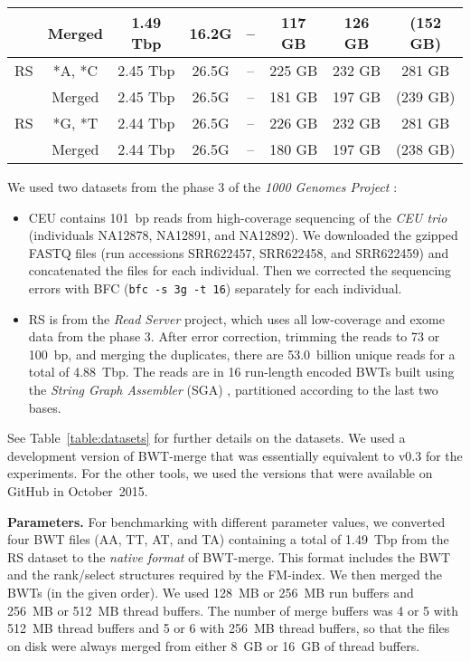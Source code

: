 \documentclass[smallabstract,smallcaptions]{dccpaper}
\newcommand{\BWT}{\textsf{BWT}}
\newcommand{\rank}{\textsf{rank}}
\newcommand{\select}{\textsf{select}}
\newcommand{\BWTmerge}{\textsf{BWT\nobreakdash-merge}}
\newcommand{\CEU}{\textsf{CEU}}
\newcommand{\RS}{\textsf{RS}}
\begin{document}
\begin{table}[t!]
\begin{center}
{\begin{tabular}{cc|cc|cc|cc}
     & Merged  & 1.49 Tbp & 16.2G &      -- &  117 GB &  126 GB & (152 GB) \\
\hline
\RS  & *A, *C  & 2.45 Tbp & 26.5G &      -- &  225 GB &  232 GB &   281 GB \\
     & Merged  & 2.45 Tbp & 26.5G &      -- &  181 GB &  197 GB & (239 GB) \\
\hline
\RS  & *G, *T  & 2.44 Tbp & 26.5G &      -- &  226 GB &  232 GB &   281 GB \\
     & Merged  & 2.44 Tbp & 26.5G &      -- &  180 GB &  197 GB & (238 GB) \\
\hline
\end{tabular}}
\end{center}
\end{table}

We used two datasets from the phase 3 of the \emph{1000 Genomes Project} \cite{1000GP2015}:
\begin{itemize}

\item \CEU{} contains 101~bp reads from high-coverage sequencing of the \emph{CEU trio} (individuals NA12878, NA12891, and NA12892). We downloaded the gzipped FASTQ files (run accessions SRR622457, SRR622458, and SRR622459) and concatenated the files for each individual. Then we corrected the sequencing errors with BFC \cite{Li2015} (\texttt{bfc -s 3g -t 16}) separately for each individual.

\item \RS{} is from the \emph{Read Server} project, which uses all low-coverage and exome data from the phase 3. After error correction, trimming the reads to 73 or 100~bp, and merging the duplicates, there are 53.0~billion unique reads for a total of 4.88~Tbp. The reads are in 16 run-length encoded \BWT{}s built using the \emph{String Graph Assembler} (SGA) \cite{Simpson2012}, partitioned according to the last two bases.

\end{itemize}
See Table~\ref{table:datasets} for further details on the datasets. We used a development version of \BWTmerge{} that was essentially equivalent to v0.3 for the experiments. For the other tools, we used the versions that were available on GitHub in October~2015.

\smallbreak\noindent\textbf{Parameters.} For benchmarking with different parameter values, we converted four \BWT{} files (AA, TT, AT, and TA) containing a total of 1.49~Tbp from the \RS{} dataset to the \emph{native format} of \BWTmerge. This format includes the \BWT{} and the \rank/\select{} structures required by the FM-index. We then merged the \BWT{}s (in the given order). We used 128~MB or 256~MB run buffers and 256~MB or 512~MB thread buffers. The number of merge buffers was 4 or 5 with 512~MB thread buffers and 5 or 6 with 256~MB thread buffers, so that the files on disk were always merged from either 8~GB or 16~GB of thread buffers.
\end{document}
